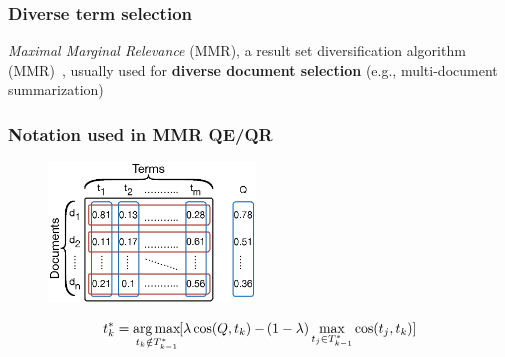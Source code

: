 \documentclass[xcolor=x11names,compress]{beamer}
\DeclareMathOperator*{\argmax}{arg\,max}
\renewcommand{\(}{\begin{columns}}
\renewcommand{\)}{\end{columns}}
\newcommand{\<}[1]{\begin{column}{#1}}
\renewcommand{\>}{\end{column}}
\begin{document}
\begin{frame}
\frametitle{Diverse term selection}
\emph{Maximal Marginal Relevance} (MMR), a result set diversification algorithm  (MMR)~\cite{Carbonell1998}, usually used for \textbf{diverse document selection} (e.g., multi-document summarization) 
\end{frame}


\begin{frame}
\frametitle{Notation used in MMR QE/QR}

\begin{figure}
\begin{center}
\includegraphics[width=5.5cm]{../img/matrix} 
\par\end{center}
\vspace{-1mm}
\label{fig:notation} 
\end{figure}

\begin{equation}
t_{k}^{*}=\argmax_{t_{k}\notin T_{k-1}^{*}}\hspace{-0.3mm}[\lambda\cos(Q,t_{k})-\hspace{-0.3mm}(1-\lambda)\max_{t_{j}\in T_{k-1}^{*}}\cos(t_{j},t_{k})]
\end{equation}




\end{frame}
\end{document}
